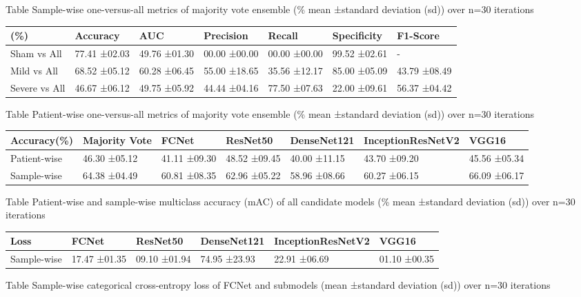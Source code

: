 \documentclass[
]{article}
\begin{document}
Table Sample-wise one-versus-all metrics of majority vote ensemble (\%
mean ±standard deviation (sd)) over n=30 iterations

\begin{longtable}[]{@{}lllllll@{}}
\toprule
(\%) & \textbf{Accuracy} & \textbf{AUC} & \textbf{Precision} &
\textbf{Recall} & \textbf{Specificity} &
\textbf{F1-Score}\tabularnewline
\midrule
\endhead
Sham vs All & 77.41 ±02.03 & 49.76 ±01.30 & 00.00 ±00.00 & 00.00 ±00.00
& 99.52 ±02.61 & -\tabularnewline
Mild vs All & 68.52 ±05.12 & 60.28 ±06.45 & 55.00 ±18.65 & 35.56 ±12.17
& 85.00 ±05.09 & 43.79 ±08.49\tabularnewline
Severe vs All & 46.67 ±06.12 & 49.75 ±05.92 & 44.44 ±04.16 & 77.50
±07.63 & 22.00 ±09.61 & 56.37 ±04.42\tabularnewline
\bottomrule
\end{longtable}

Table Patient-wise one-versus-all metrics of majority vote ensemble (\%
mean ±standard deviation (sd)) over n=30 iterations

\begin{longtable}[]{@{}lllllll@{}}
\toprule
Accuracy(\%) & \textbf{Majority Vote} & \textbf{FCNet} &
\textbf{ResNet50} & \textbf{DenseNet121} & \textbf{InceptionResNetV2} &
\textbf{VGG16}\tabularnewline
\midrule
\endhead
Patient-wise & 46.30 ±05.12 & 41.11 ±09.30 & 48.52 ±09.45 & 40.00 ±11.15
& 43.70 ±09.20 & 45.56 ±05.34\tabularnewline
Sample-wise & 64.38 ±04.49 & 60.81 ±08.35 & 62.96 ±05.22 & 58.96 ±08.66
& 60.27 ±06.15 & 66.09 ±06.17\tabularnewline
\bottomrule
\end{longtable}

Table Patient-wise and sample-wise multiclass accuracy (mAC) of all
candidate models (\% mean ±standard deviation (sd)) over n=30 iterations

\begin{longtable}[]{@{}llllll@{}}
\toprule
Loss & \textbf{FCNet} & \textbf{ResNet50} & \textbf{DenseNet121} &
\textbf{InceptionResNetV2} & \textbf{VGG16}\tabularnewline
\midrule
\endhead
Sample-wise & 17.47 ±01.35 & 09.10 ±01.94 & 74.95 ±23.93 & 22.91 ±06.69
& 01.10 ±00.35\tabularnewline
\bottomrule
\end{longtable}

Table Sample-wise categorical cross-entropy loss of FCNet and submodels
(mean ±standard deviation (sd)) over n=30 iterations
\end{document}
